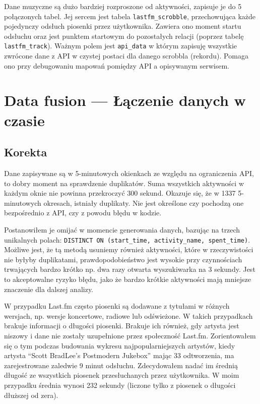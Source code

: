 \documentclass[brudnopis]{xmgr}
\begin{document}
    Dane muzyczne są dużo bardziej rozproszone od aktywności, zapisuje je do 5 połączonych tabel.
    Jej sercem jest tabela \verb|lastfm_scrobble|, przechowująca każde pojedynczy odsłuch piosenki przez użytkownika.
    Zawiera ono moment startu odsłuchu oraz jest punktem startowym do pozostałych relacji (poprzez tabelę \verb|lastfm_track|).
    Ważnym polem jest \verb|api_data| w którym zapisuję wszystkie zwrócone dane z API w czystej postaci dla danego scrobbla (rekordu).
    Pomaga ono przy debugowaniu mapowań pomiędzy API a opisywanym serwisem.

    \section{Data fusion --- Łączenie danych w czasie}

        \subsection{Korekta}

            Dane zapisywane są w 5-minutowych okienkach ze względu na ograniczenia API, to dobry moment na sprawdzenie duplikatów.
            Suma wszystkich aktywności w każdym oknie nie powinna przekroczyć 300 sekund.
            Okazuje się, że w 1337 5-minutowych okresach, istniały duplikaty.
            Nie jest określone czy pochodzą one bezpośrednio z API, czy z powodu błędu w kodzie.

            Postanowiłem je omijać w momencie generowania danych, bazując na trzech unikalnych polach:
            \verb|DISTINCT ON (start_time, activity_name, spent_time)|.
            Możliwe jest, że tą metodą usuniemy również aktywności, które w rzeczywistości nie byłyby duplikatami,
            prawdopodobieństwo jest wysokie przy czynnościach trwających bardzo krótko np. dwa razy otwarta wyszukiwarka na 3 sekundy.
            Jest to akceptowalne ryzyko błędu, jako że bardzo krótkie aktywności mają mniejsze znaczenie dla dalszej analizy.

            W przypadku Last.fm często piosenki są dodawane z tytułami w różnych wersjach, np. wersje koncertowe, radiowe lub odświeżone.
            W takich przypadkach brakuje informacji o długości piosenki.
            Brakuje ich również, gdy artysta jest niszowy i dane nie zostały uzupełnione przez społeczność Last.fm.
            Zorientowałem się o tym podczas budowania wykresu najpopularniejszych artystów,
            kiedy artysta ``Scott BradLee's Postmodern Jukebox'' mając 33 odtworzenia, ma zarejestrowane zaledwie 9 minut odsłuchu.
            Zdecydowałem nadać im średnią długość ze wszystkich piosenek przesłuchanych przez użytkownika.
            W moim przypadku średnia wynosi 232 sekundy (liczone tylko z piosenek o długości dłuższej od zera).
\end{document}
